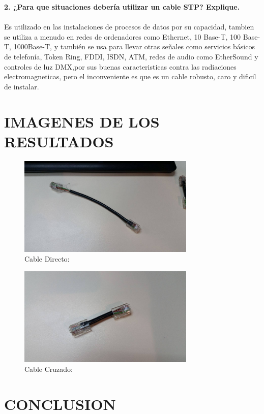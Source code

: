 \documentclass[onecolumn,12pt]{IEEEtran}
\begin{document}
\textbf{2. ¿Para que situaciones debería utilizar un cable STP? Explique.}\\
\hfill \\
Es utilizado en las instalaciones de procesos de datos por su capacidad, tambien se utiliza a menudo en redes de ordenadores como Ethernet, 10 Base-T, 100 Base-T, 1000Base-T, y también se usa para llevar otras señales como servicios básicos de telefonía, Token Ring, FDDI, ISDN, ATM, redes de audio como EtherSound y controles de luz DMX,por sus buenas caracteristicas contra las radiaciones electromagneticas, pero el inconveniente es que es un cable robusto, caro y dificil de instalar.

\newpage
\section{IMAGENES DE LOS RESULTADOS}
\begin{figure}[h]
\caption{Cable Directo:}
\centering \includegraphics[width=0.75\textwidth]{CableDirecto.jpg}
\end{figure}


\begin{figure}[h]
\caption{Cable Cruzado:}
\centering \includegraphics[width=0.75\textwidth]{CableCruzado.jpg}
\end{figure}


\newpage
\section{CONCLUSION}
\hfill \\
\end{document}
